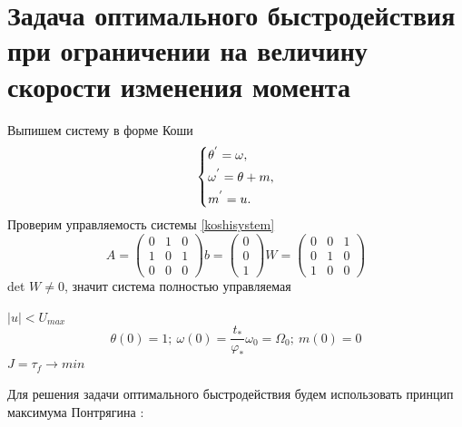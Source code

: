 \documentclass[a4paper,14pt]{article}
\theoremstyle{plain} %
\theoremstyle{definition} %
\theoremstyle{remark} %
\begin{document}
{\section{Задача оптимального быстродействия при ограничении на величину скорости изменения момента}
Выпишем систему в форме Коши
\begin{equation}\label{koshisystem}
    \left\{ {\begin{aligned}
                 & \theta^{'} = \omega , \hfill   \\
                 & \omega^{'} = \theta+m , \hfill \\
                 & m^{'} = u . \hfill             \\
            \end{aligned}} \right.
\end{equation}
Проверим управляемость системы \eqref{koshisystem}
\begin{equation*}
    A =
    \begin{pmatrix}
        0 & 1 & 0 \\
        1 & 0 & 1 \\
        0 & 0 & 0
    \end{pmatrix}
    b =
    \begin{pmatrix}
        0 \\
        0 \\
        1
    \end{pmatrix}
    W =
    \begin{pmatrix}
        0 & 0 & 1 \\
        0 & 1 & 0 \\
        1 & 0 & 0
    \end{pmatrix}
\end{equation*}
det $W\neq0$, значит система полностью управляемая

$|u|<U_{max}$
\[
    \theta(0)=1;\ \omega(0)=\frac{t_\ast}{\varphi_\ast}\omega_0=\Omega_0;\ m(0)=0
\]
$J=\tau_f\to min$

Для решения задачи оптимального быстродействия будем использовать принцип максимума Понтрягина \cite{Specpract}:

}
\end{document}
